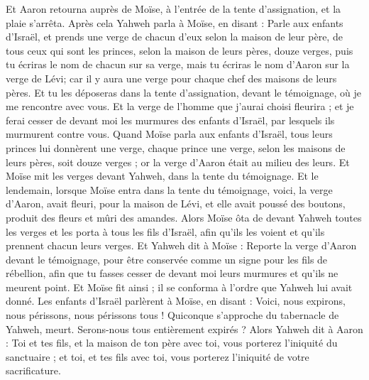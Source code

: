 \begin{multicols}{2}
Et Aaron retourna auprès de Moïse, à l'entrée de la tente d'assignation, et la plaie s’arrêta.
\VerseOne{}Après cela Yahweh parla à Moïse, en disant :
Parle aux enfants d’Israël, et prends une verge de chacun d’eux selon la maison de leur père, de tous ceux qui sont les princes, selon la maison de leurs pères, douze verges, puis tu écriras le nom de chacun sur sa verge,
mais tu écriras le nom d'Aaron sur la verge de Lévi; car il y aura une verge pour chaque chef des maisons de leurs pères.
Et tu les déposeras dans la tente d'assignation, devant le témoignage, où je me rencontre avec vous.
Et la verge de l'homme que j'aurai choisi fleurira ; et je ferai cesser de devant moi les murmures des enfants d'Israël, par lesquels ils murmurent contre vous.
Quand Moïse parla aux enfants d'Israël, tous leurs princes lui donnèrent une verge, chaque prince une verge, selon les maisons de leurs pères, soit douze verges ; or la verge d'Aaron était au milieu des leurs.
Et Moïse mit les verges devant Yahweh, dans la tente du témoignage.
Et le lendemain, lorsque Moïse entra dans la tente du témoignage, voici, la verge d'Aaron, avait fleuri, pour la maison de Lévi, et elle avait poussé des boutons, produit des fleurs et mûri des amandes.
Alors Moïse ôta de devant Yahweh toutes les verges et les porta à tous les fils d'Israël, afin qu'ils les voient et qu'ils prennent chacun leurs verges.
Et Yahweh dit à Moïse : Reporte la verge d'Aaron devant le témoignage, pour être conservée comme un signe pour les fils de rébellion, afin que tu fasses cesser de devant moi leurs murmures et qu'ils ne meurent point.
Et Moïse fit ainsi ; il se conforma à l'ordre que Yahweh lui avait donné.
Les enfants d'Israël parlèrent à Moïse, en disant : Voici, nous expirons, nous périssons, nous périssons tous !
Quiconque s'approche du tabernacle de Yahweh, meurt. Serons-nous tous entièrement expirés ?
\VerseOne{}Alors Yahweh dit à Aaron : Toi et tes fils, et la maison de ton père avec toi, vous porterez l'iniquité du sanctuaire ; et toi, et tes fils avec toi, vous porterez l'iniquité de votre sacrificature.

\end{multicols}
